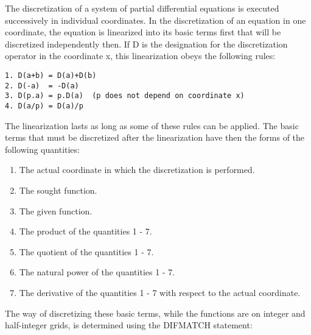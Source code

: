      The discretization of a system of partial differential equations is
executed successively in individual  coordinates. In  the discretization
of an  equation in  one coordinate,  the equation is linearized into its
basic terms first that will be discretized independently then.   If D is
the  designation  for  the  discretization operator in the coordinate x,
this linearization obeys the following rules:
\begin{verbatim}
1. D(a+b) = D(a)+D(b)
2. D(-a)  = -D(a)
3. D(p.a) = p.D(a)  (p does not depend on coordinate x)
4. D(a/p) = D(a)/p
\end{verbatim}
     The linearization lasts as long  as  some  of  these  rules  can be
applied.   The   basic   terms   that  must  be  discretized  after  the
linearization have then the forms of the following quantities:
\begin{enumerate}
  \item The actual coordinate in which the discretization is performed.
   \item The sought function.
   \item The given function.
   \item The product of the quantities 1 - 7.
   \item The quotient of the quantities 1 - 7.
   \item The natural power of the quantities 1 - 7.
   \item The derivative of the quantities 1 - 7 with respect to the
     actual coordinate.
\end{enumerate}
The way of discretizing these basic  terms, while  the functions  are on
integer  and  half-integer  grids,  is  determined  using  the  DIFMATCH
statement:
